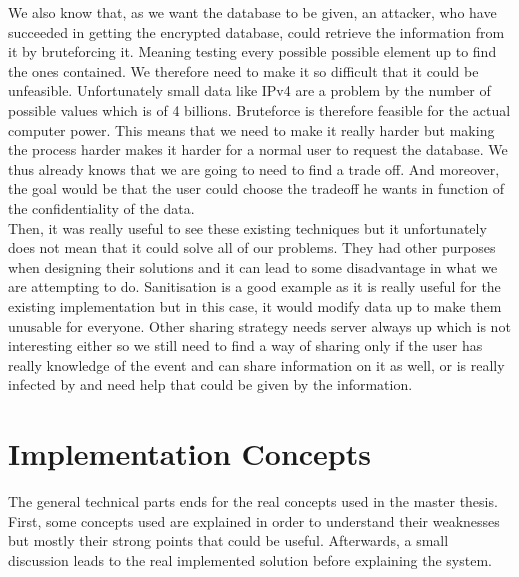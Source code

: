 \documentclass{eplmastersthesis}
\begin{document}
We also know that, as we want the database to be given, an attacker, who have succeeded in getting the encrypted database, could retrieve the information from it by bruteforcing it. Meaning testing every possible possible element up to find the ones contained. We therefore  need to make it so difficult that it could be unfeasible.
Unfortunately small data like IPv4 are a problem by the number of possible values which is of 4 billions. Bruteforce is therefore feasible for the actual computer power. This means that we need to make it really harder but making the process harder makes it harder for a normal user to request the database. We thus already knows that we are going to need to find a trade off. And moreover, the goal would be that the user could choose the tradeoff he wants in function of the  confidentiality of the data.\\

Then, it was really useful to see these existing techniques but it unfortunately does not mean that it could solve all of our problems. They had other purposes when designing their solutions and it can lead to some disadvantage in what we are attempting to do.
Sanitisation is a good example as it is really useful for the existing implementation but in this case, it would modify data up to make them unusable for everyone.
Other sharing strategy needs server always up which is not interesting either so we still need to find a way of sharing only if the user has really knowledge of the event and can share information on it as well, or is really infected by and need help that could be given by the information.\\


\chapter{Implementation Concepts}
The general technical parts ends for the real concepts used in the master thesis. First, some concepts used are explained in order to understand their weaknesses but mostly their strong points that could be useful. Afterwards, a small discussion leads to the real implemented solution before explaining the system.
\end{document}
